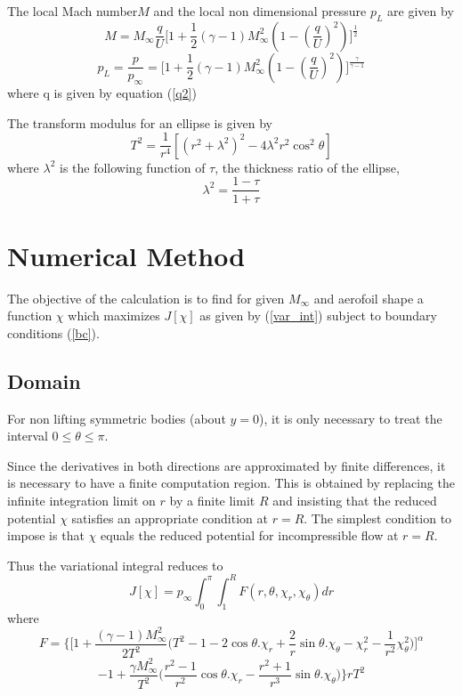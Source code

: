 \documentclass[a4paper]{report}
\begin{document}
	The local Mach number$M$ and the local non dimensional pressure $p_L$ are given by
	\begin{equation}\label{mach}
		M = M_\infty\frac{q}{U}
		\Biggl[
			1 + \frac{1}{2}(\gamma-1)M_\infty^2
			\left(1-\left(\frac{q}{U}\right)^2\right)
		\Biggr]	^\frac{1}{2}
	\end{equation}
	\begin{equation}\label{pressure}
		p_L = \frac{p}{p_\infty} = 
		\Biggl[
			1 + \frac{1}{2}(\gamma-1)M_\infty^2
			\left(1-\left(\frac{q}{U}\right)^2\right)		
		\Biggr]^\frac{\gamma}{\gamma-1}
	\end{equation}
	where q is given by equation (\ref{q2})
	
	The transform modulus for an ellipse is given by
	\begin{equation}\label{T}
		T^2 = \frac{1}{r^4} \left[
			\left(r^2+\lambda^2\right)^2 - 
			4\lambda^2r^2\cos^2\theta
		\right]
	\end{equation}		
	where $\lambda^2$ is the following function of $\tau$, the thickness ratio of the ellipse,
	\begin{equation}
		\lambda^2 = \frac{1-\tau}{1+\tau}
	\end{equation}
	
  	\section{Numerical Method}
	
	The objective of the calculation is to find for given $M_\infty$ and aerofoil shape a function $\chi$ which maximizes $J[\chi]$ as given by (\ref{var_int}) subject to boundary conditions (\ref{bc}).
	
	
	\subsection{Domain}
	For non lifting symmetric bodies (about $y=0$), it is only necessary to treat the interval $0 \leq \theta  \leq \pi$.
	
	Since the derivatives in both directions are approximated by finite differences, it is necessary to have a finite computation region. This is obtained by replacing the infinite integration limit on $r$ by a finite limit $R$ and insisting that the reduced potential $\chi$ satisfies an appropriate condition at $r=R$. The simplest condition to impose is that $\chi$ equals the reduced potential for incompressible flow at $r=R$. 
	
	Thus the variational integral reduces to
	\begin{equation}\label{var_int_reduced}
	J[\chi] = p_\infty \int^\pi_0 \int^R_1 F(r,\theta,\chi_r,\chi_\theta)dr
	\end{equation}
	where
	$$
	F = \Biggl\{
			\Biggl[
				1 + \frac{(\gamma-1)M_\infty^2}{2T^2}
				\Biggl(
					T^2-1-2\cos\theta.\chi_r+\frac{2}{r}\sin\theta.\chi_\theta - \chi_r^2-\frac{1}{r^2}\chi_\theta^2
				\Biggr)
			\Biggr]^\alpha
			$$
			$$
			-1+\frac{\gamma M_\infty^2}{T^2}
			\Biggl(
				\frac{r^2-1}{r^2}\cos\theta.\chi_r
				- \frac{r^2+1}{r^3}\sin\theta.\chi_\theta
			\Biggr)
		\Biggr\}rT^2
	$$
	
\end{document}
